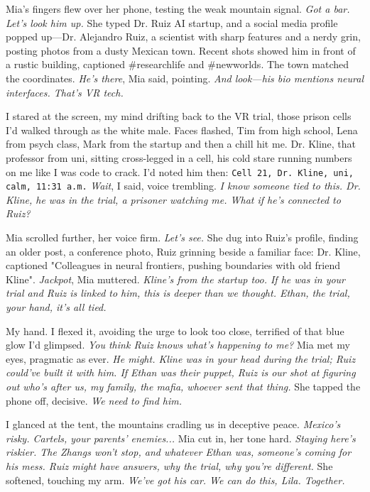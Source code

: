 \documentclass[12pt,oneside]{book}
\newcommand{\note}[1]{\texttt{#1}}
\begin{document}
Mia’s fingers flew over her phone, testing the weak mountain signal. \textit{Got a bar. Let’s look him up.} She typed \textnormal{Dr. Ruiz AI startup}, and a social media profile popped up—Dr. Alejandro Ruiz, a scientist with sharp features and a nerdy grin, posting photos from a dusty Mexican town. Recent shots showed him in front of a rustic building, captioned \textnormal{\#researchlife} and \textnormal{\#newworlds}. The town matched the coordinates. \textit{He’s there}, Mia said, pointing. \textit{And look—his bio mentions neural interfaces. That’s VR tech.}

I stared at the screen, my mind drifting back to the VR trial, those prison cells I’d walked through as the white male. Faces flashed, Tim from high school, Lena from psych class, Mark from the startup and then a chill hit me. Dr. Kline, that professor from uni, sitting cross-legged in a cell, his cold stare running numbers on me like I was code to crack. I’d noted him then: \note{Cell 21, Dr. Kline, uni, calm, 11:31 a.m.} \textit{Wait}, I said, voice trembling. \textit{I know someone tied to this. Dr. Kline, he was in the trial, a prisoner watching me. What if he’s connected to Ruiz?}

Mia scrolled further, her voice firm. \textit{Let’s see.} She dug into Ruiz’s profile, finding an older post, a conference photo, Ruiz grinning beside a familiar face: Dr. Kline, captioned \textnormal{"Colleagues in neural frontiers, pushing boundaries with old friend Kline"}. \textit{Jackpot}, Mia muttered. \textit{Kline’s from the startup too. If he was in your trial and Ruiz is linked to him, this is deeper than we thought. Ethan, the trial, your hand, it’s all tied.}

My hand. I flexed it, avoiding the urge to look too close, terrified of that blue glow I’d glimpsed. \textit{You think Ruiz knows what’s happening to me?} Mia met my eyes, pragmatic as ever. \textit{He might. Kline was in your head during the trial; Ruiz could’ve built it with him. If Ethan was their puppet, Ruiz is our shot at figuring out who’s after us, my family, the mafia, whoever sent that thing.} She tapped the phone off, decisive. \textit{We need to find him.}

I glanced at the tent, the mountains cradling us in deceptive peace. \textit{Mexico’s risky. Cartels, your parents’ enemies...} Mia cut in, her tone hard. \textit{Staying here’s riskier. The Zhangs won’t stop, and whatever Ethan was, someone’s coming for his mess. Ruiz might have answers, why the trial, why you’re different.} She softened, touching my arm. \textit{We’ve got his car. We can do this, Lila. Together.}
\end{document}
